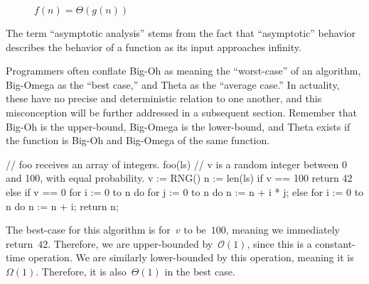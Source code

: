 \begin{figure}[H]
  \centering
{}
\caption{$f(n) = \Theta(g(n))$}
\end{figure}

The term ``asymptotic analysis'' stems from the fact that ``asymptotic'' behavior describes the behavior of a function as its input approaches infinity. 

Programmers often conflate Big-Oh as meaning the ``worst-case'' of an algorithm, Big-Omega as the ``best case,'' and Theta as the ``average case.'' 
In actuality, these have no precise and deterministic relation to one another, and this misconception will be further addressed in a subsequent section. 
Remember that Big-Oh is the upper-bound, Big-Omega is the lower-bound, and Theta exists if the function is Big-Oh and Big-Omega of the same function.

\begin{verbnobox}[\small]
// foo receives an array of integers.
foo(ls) {
  // v is a random integer between 0 and 100, with equal probability.
  v := RNG()
  n := len(ls)
  if v == 100
    return 42
  else if v == 0
    for i := 0 to n do
      for j := 0 to n do
        n := n + i * j;
  else
    for i := 0 to n do
      n := n + i;
  return n;
}
\end{verbnobox}

The best-case for this algorithm is for~$v$ to be~$100$, meaning we immediately return~$42$. 
Therefore, we are upper-bounded by~$\mathcal{O}(1)$, since this is a constant-time operation. 
We are similarly lower-bounded by this operation, meaning it is~$\Omega{(1)}$. 
Therefore, it is also~$\Theta(1)$ in the best case.

